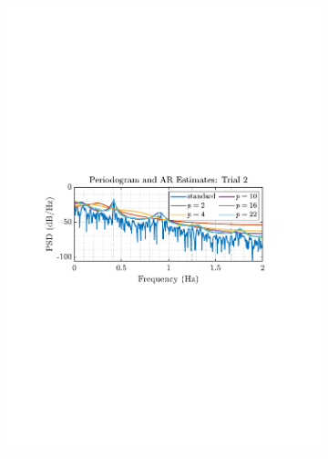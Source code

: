 \documentclass[12pt]{article}
\numberwithin{equation}{section}
\begin{document}
\begin{figure}[H]
\begin{subfigure}{0.49\textwidth}
				\includegraphics[trim={2.2cm 11.2cm 3.15cm  11.2cm}, clip, width=\textwidth]{../MATLAB/figures/q1_5c_fig02.pdf} 
				\caption{}
			\end{subfigure}%
			

\end{figure}
\end{document}
